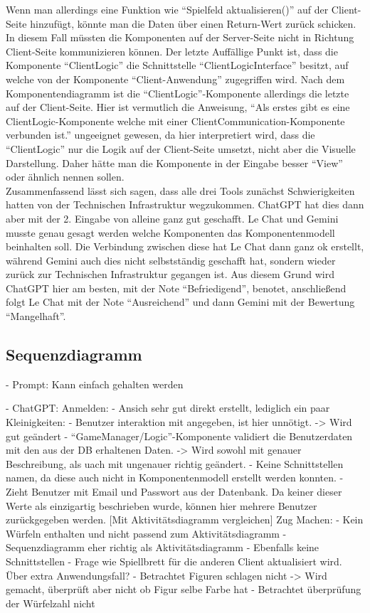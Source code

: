 Wenn man allerdings eine Funktion wie ``Spielfeld aktualisieren()'' auf der Client-Seite hinzufügt, könnte man die Daten über einen Return-Wert zurück schicken.
In diesem Fall müssten die Komponenten auf der Server-Seite nicht in Richtung Client-Seite kommunizieren können. Der letzte Auffällige Punkt ist, dass die 
Komponente ``ClientLogic'' die Schnittstelle ``ClientLogicInterface'' besitzt, auf welche von der Komponente ``Client-Anwendung'' zugegriffen wird. Nach dem 
Komponentendiagramm ist die ``ClientLogic''-Komponente allerdings die letzte auf der Client-Seite. Hier ist vermutlich die Anweisung, ``Als erstes gibt es 
eine ClientLogic-Komponente welche mit einer ClientCommunication-Komponente verbunden ist.'' ungeeignet gewesen, da hier interpretiert wird, dass die ``ClientLogic''
nur die Logik auf der Client-Seite umsetzt, nicht aber die Visuelle Darstellung. Daher hätte man die Komponente in der Eingabe besser ``View'' oder ähnlich nennen
sollen.\\

Zusammenfassend lässt sich sagen, dass alle drei Tools zunächst Schwierigkeiten hatten von der Technischen Infrastruktur wegzukommen. ChatGPT hat dies 
dann aber mit der 2. Eingabe von alleine ganz gut geschafft. Le Chat und Gemini musste genau gesagt werden welche Komponenten das Komponentenmodell 
beinhalten soll. Die Verbindung zwischen diese hat Le Chat dann ganz ok erstellt, während Gemini auch dies nicht selbstständig geschafft hat, sondern
wieder zurück zur Technischen Infrastruktur gegangen ist. Aus diesem Grund wird ChatGPT hier am besten, mit der Note ``Befriedigend'', benotet, 
anschließend folgt Le Chat mit der Note ``Ausreichend'' und dann Gemini mit der Bewertung ``Mangelhaft''.


\subsection*{Sequenzdiagramm}

- Prompt: Kann einfach gehalten werden

- ChatGPT:
    Anmelden:
        - Ansich sehr gut direkt erstellt, lediglich ein paar Kleinigkeiten:
        - Benutzer interaktion mit angegeben, ist hier unnötigt. -> Wird gut geändert
        - ``GameManager/Logic''-Komponente validiert die Benutzerdaten mit den aus der DB erhaltenen Daten. -> Wird sowohl mit genauer Beschreibung, als uach mit ungenauer richtig 
        geändert.
        - Keine Schnittstellen namen, da diese auch nicht in Komponentenmodell erstellt werden konnten.
        - Zieht Benutzer mit Email und Passwort aus der Datenbank. Da keiner dieser Werte als einzigartig beschrieben wurde, können hier mehrere Benutzer zurückgegeben werden.
        [Mit Aktivitätsdiagramm vergleichen]
    Zug Machen:
        - Kein Würfeln enthalten und nicht passend zum Aktivitätsdiagramm
        - Sequenzdiagramm eher richtig als Aktivitätsdiagramm
        - Ebenfalls keine Schnittstellen
        - Frage wie Spiellbrett für die anderen Client aktualisiert wird. Über extra Anwendungsfall?
        - Betrachtet Figuren schlagen nicht -> Wird gemacht, überprüft aber nicht ob Figur selbe Farbe hat
        - Betrachtet überprüfung der Würfelzahl nicht

